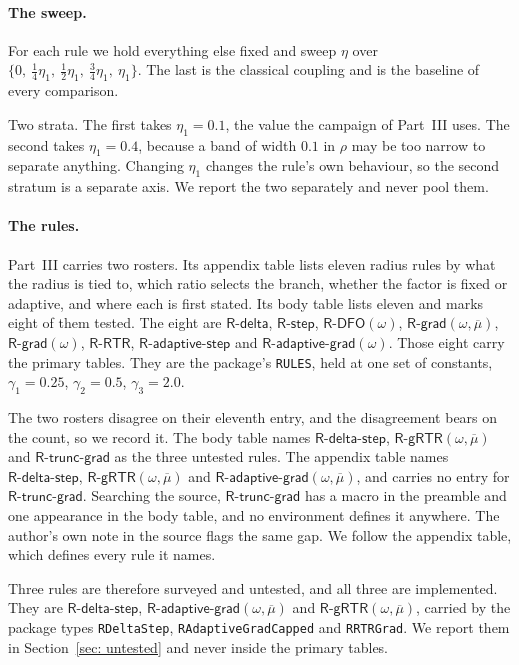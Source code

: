 \documentclass[11pt,a4paper]{article}
\providecommand{\Rdelta}{\textsf{R-delta}}
\providecommand{\Rstep}{\textsf{R-step}}
\providecommand{\Rdfo}{\textsf{R-DFO}}
\providecommand{\Rgrad}{\textsf{R-grad}}
\providecommand{\Rrtr}{\textsf{R-RTR}}
\providecommand{\Rgrtr}{\textsf{R-gRTR}}
\providecommand{\RAdaptiveGrad}{\textsf{R-adaptive-grad}}
\providecommand{\RAdaptstep}{\textsf{R-adaptive-step}}
\providecommand{\Rdeltastep}{\textsf{R-delta-step}}
\providecommand{\Rtruncgrad}{\textsf{R-trunc-grad}}
\providecommand{\gone}{\gamma_1}
\providecommand{\gtwo}{\gamma_2}
\providecommand{\gthree}{\gamma_3}
\begin{document}
\paragraph{The sweep.}
For each rule we hold everything else fixed and sweep $\eta$ over
$\{0,\ \tfrac14\eta_1,\ \tfrac12\eta_1,\ \tfrac34\eta_1,\ \eta_1\}$. The last
is the classical coupling and is the baseline of every comparison.

Two strata. The first takes $\eta_1 = 0.1$, the value the campaign of Part~III
uses. The second takes $\eta_1 = 0.4$, because a band of width $0.1$ in $\rho$
may be too narrow to separate anything. Changing $\eta_1$ changes the rule's own
behaviour, so the second stratum is a separate axis. We report the two
separately and never pool them.

\paragraph{The rules.}
Part~III carries two rosters. Its appendix table lists eleven radius rules by
what the radius is tied to, which ratio selects the branch, whether the factor
is fixed or adaptive, and where each is first stated. Its body table lists
eleven and marks eight of them tested. The eight are $\Rdelta$, $\Rstep$,
$\Rdfo(\omega)$, $\Rgrad(\omega, \overline{\mu})$, $\Rgrad(\omega)$, $\Rrtr$,
$\RAdaptstep$ and $\RAdaptiveGrad(\omega)$. Those eight carry the primary
tables. They are the package's \texttt{RULES}, held at one set of constants,
$\gone = 0.25$, $\gtwo = 0.5$, $\gthree = 2.0$.

The two rosters disagree on their eleventh entry, and the disagreement bears on
the count, so we record it. The body table names $\Rdeltastep$,
$\Rgrtr(\omega,\overline{\mu})$ and $\Rtruncgrad$ as the three untested rules.
The appendix table names $\Rdeltastep$, $\Rgrtr(\omega,\overline{\mu})$ and
$\RAdaptiveGrad(\omega,\overline{\mu})$, and carries no entry for
$\Rtruncgrad$. Searching the source, $\Rtruncgrad$ has a macro in the preamble
and one appearance in the body table, and no environment defines it anywhere.
The author's own note in the source flags the same gap. We follow the appendix
table, which defines every rule it names.

Three rules are therefore surveyed and untested, and all three are implemented.
They are $\Rdeltastep$, $\RAdaptiveGrad(\omega,\overline{\mu})$ and
$\Rgrtr(\omega,\overline{\mu})$, carried by the package types
\texttt{RDeltaStep}, \texttt{RAdaptiveGradCapped} and \texttt{RRTRGrad}. We
report them in Section~\ref{sec: untested} and never inside the primary tables.
\end{document}
